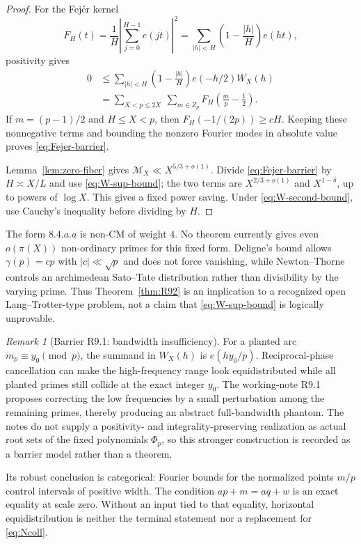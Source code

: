 \documentclass[11pt]{amsart}
\theoremstyle{plain}
\theoremstyle{remark}
\newtheorem{remark}{Remark}
\begin{document}
\begin{proof}
For the Fej\'er kernel
\[
 F_H(t)=\frac1H\left|\sum_{j=0}^{H-1}e(jt)\right|^2
 =\sum_{|h|<H}\left(1-\frac{|h|}{H}\right)e(ht),
\]
positivity gives
\begin{align*}
 0&\leq
 \sum_{|h|<H}\left(1-\frac{|h|}{H}\right)
 e(-h/2)W_X(h)\\
 &=\sum_{X<p\leq2X}\ \sum_{m\in Z_p}
 F_H\left(\frac mp-\frac12\right).
\end{align*}
If $m=(p-1)/2$ and $H\leq X<p$, then
$F_H(-1/(2p))\geq cH$.  Keeping these nonnegative terms and bounding
the nonzero Fourier modes in absolute value proves
\eqref{eq:Fejer-barrier}.

Lemma~\ref{lem:zero-fiber} gives
$\mathcal M_X\ll X^{5/3+o(1)}$.  Divide
\eqref{eq:Fejer-barrier} by $H\asymp X/L$ and use
\eqref{eq:W-sup-bound}; the two terms are
$X^{2/3+o(1)}$ and $X^{1-\delta}$, up to powers of $\log X$.
This gives a fixed power saving.  Under \eqref{eq:W-second-bound}, use
Cauchy's inequality before dividing by $H$.
\end{proof}

The form $8.4.a.a$ is non-CM of weight $4$.  No theorem currently
gives even $o(\pi(X))$ non-ordinary primes for this fixed form.  Deligne's
bound allows $\gamma(p)=cp$ with $|c|\ll\sqrt p$ and does not force
vanishing, while Newton--Thorne controls an archimedean Sato--Tate
distribution rather than divisibility by the varying prime.  Thus
Theorem~\ref{thm:R92} is an implication to a recognized open
Lang--Trotter-type problem, not a claim that \eqref{eq:W-sup-bound} is
logically unprovable.

\begin{remark}[Barrier R9.1: bandwidth insufficiency]
\label{rem:R91}
For a planted arc $m_p\equiv y_0\pmod p$, the summand in $W_X(h)$ is
$e(hy_0/p)$.  Reciprocal-phase cancellation can make the high-frequency
range look equidistributed while all planted primes still collide at
the exact integer $y_0$.  The working-note R9.1 proposes correcting the
low frequencies by a small perturbation among the remaining primes,
thereby producing an abstract full-bandwidth phantom.  The notes do not
supply a positivity- and integrality-preserving realization as actual
root sets of the fixed polynomials $\Phi_p$, so this stronger
construction is recorded as a barrier model rather than a theorem.

Its robust conclusion is categorical: Fourier bounds for the normalized
points $m/p$ control intervals of positive width.  The condition
$ap+m=aq+w$ is an exact equality at scale zero.  Without an input tied
to that equality, horizontal equidistribution is neither the terminal
statement nor a replacement for \eqref{eq:Ncoll}.
\end{remark}
\end{document}
